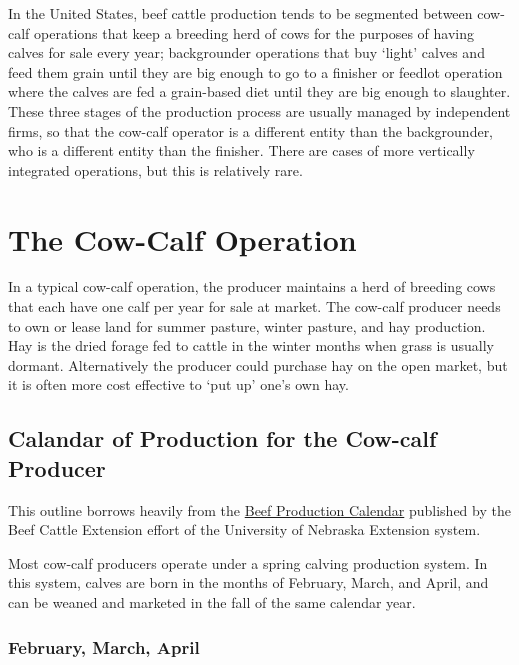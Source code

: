 \documentclass[
  letterpaper,
  DIV=11,
  numbers=noendperiod]{scrreprt}
\begin{document}
In the United States, beef cattle production tends to be segmented
between cow-calf operations that keep a breeding herd of cows for the
purposes of having calves for sale every year; backgrounder operations
that buy `light' calves and feed them grain until they are big enough to
go to a finisher or feedlot operation where the calves are fed a
grain-based diet until they are big enough to slaughter. These three
stages of the production process are usually managed by independent
firms, so that the cow-calf operator is a different entity than the
backgrounder, who is a different entity than the finisher. There are
cases of more vertically integrated operations, but this is relatively
rare.

\hypertarget{the-cow-calf-operation}{%
\section{The Cow-Calf Operation}\label{the-cow-calf-operation}}

In a typical cow-calf operation, the producer maintains a herd of
breeding cows that each have one calf per year for sale at market. The
cow-calf producer needs to own or lease land for summer pasture, winter
pasture, and hay production. Hay is the dried forage fed to cattle in
the winter months when grass is usually dormant. Alternatively the
producer could purchase hay on the open market, but it is often more
cost effective to `put up' one's own hay.

\hypertarget{calandar-of-production-for-the-cow-calf-producer}{%
\subsection{Calandar of Production for the Cow-calf
Producer}\label{calandar-of-production-for-the-cow-calf-producer}}

This outline borrows heavily from the
\href{http://beef.unl.edu/beefprodcal.shtml}{Beef Production Calendar}
published by the Beef Cattle Extension effort of the University of
Nebraska Extension system.

Most cow-calf producers operate under a spring calving production
system. In this system, calves are born in the months of February,
March, and April, and can be weaned and marketed in the fall of the same
calendar year.

\hypertarget{february-march-april}{%
\subsubsection{February, March, April}\label{february-march-april}}
\end{document}
